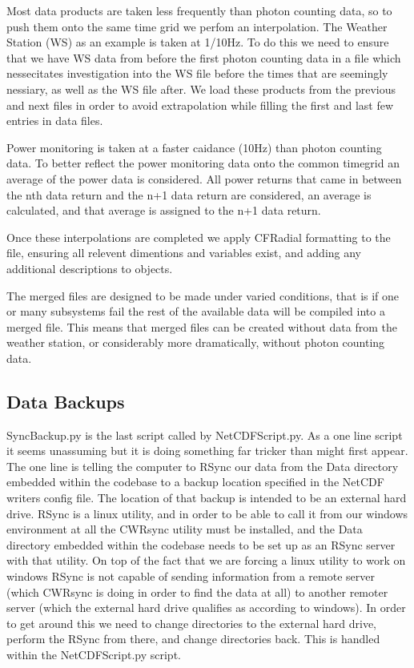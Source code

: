 Most data products are taken less frequently than photon counting data, so to push them onto the same time grid we perfom an interpolation. The Weather Station (WS) as an example is taken at 1/10Hz. To do this we need to ensure that we have WS data from before the first photon counting data in a file which nessecitates investigation into the WS file before the times that are seemingly nessiary, as well as the WS file after. We load these products from the previous and next files in order to avoid extrapolation while filling the first and last few entries in data files. 

Power monitoring is taken at a faster caidance (10Hz) than photon counting data. To better reflect the power monitoring data onto the common timegrid an average of the power data is considered. All power returns that came in between the nth data return and the n+1 data return are considered, an average is calculated, and that average is assigned to the n+1 data return. 

Once these interpolations are completed we apply CFRadial formatting to the file, ensuring all relevent dimentions and variables exist, and adding any additional descriptions to objects. 

The merged files are designed to be made under varied conditions, that is if one or many subsystems fail the rest of the available data will be compiled into a merged file. This means that merged files can be created without data from the weather station, or considerably more dramatically, without photon counting data. 

\subsection{Data Backups}

SyncBackup.py is the last script called by NetCDFScript.py. As a one line script it seems unassuming but it is doing something far tricker than might first appear. The one line is telling the computer to RSync our data from the Data directory embedded within the codebase to a backup location specified in the NetCDF writers config file. The location of that backup is intended to be an external hard drive. RSync is a linux utility, and in order to be able to call it from our windows environment at all the CWRsync utility must be installed, and the Data directory embedded within the codebase needs to be set up as an RSync server with that utility. On top of the fact that we are forcing a linux utility to work on windows RSync is not capable of sending information from a remote server (which CWRsync is doing in order to find the data at all) to another remoter server (which the external hard drive qualifies as according to windows). In order to get around this we need to change directories to the external hard drive, perform the RSync from there, and change directories back. This is handled within the NetCDFScript.py script. 

